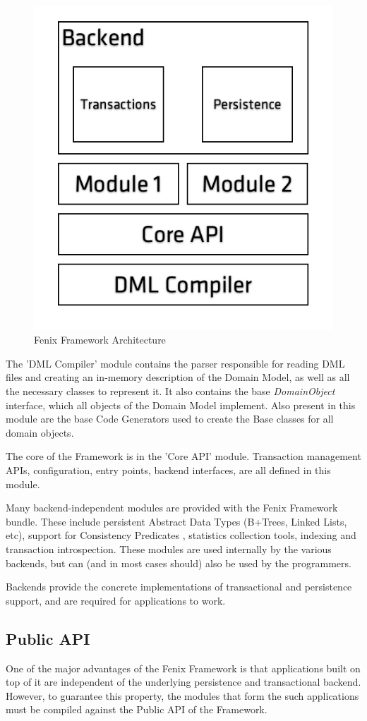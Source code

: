 \begin{figure}
\centering
\includegraphics[width=0.5\linewidth]{ff-arch}
\caption{Fenix Framework Architecture}
\label{fig:ff-arch}
\end{figure}

The 'DML Compiler' module contains the parser responsible for reading
DML files and creating an in-memory description of the Domain Model,
as well as all the necessary classes to represent it. It also contains
the base {\it DomainObject} interface, which all objects of the Domain
Model implement. Also present in this module are the base Code
Generators used to create the Base classes for all domain
objects.

The core of the Framework is in the 'Core API' module. Transaction
management APIs, configuration, entry points, backend interfaces, are
all defined in this module.

Many backend-independent modules are provided with the Fenix Framework
bundle. These include persistent Abstract Data Types (B+Trees, Linked
Lists, etc), support for Consistency
Predicates \cite{JoaoCoutinhoNeves2011}, statistics collection tools,
indexing and transaction introspection. These modules are used
internally by the various backends, but can (and in most cases should)
also be used by the programmers.

Backends provide the concrete implementations of transactional and
persistence support, and are required for applications to work.

\subsection{Public API}

One of the major advantages of the Fenix Framework is that
applications built on top of it are independent of the underlying
persistence and transactional backend. However, to guarantee this
property, the modules that form the such applications must be compiled
against the Public API of the Framework.

